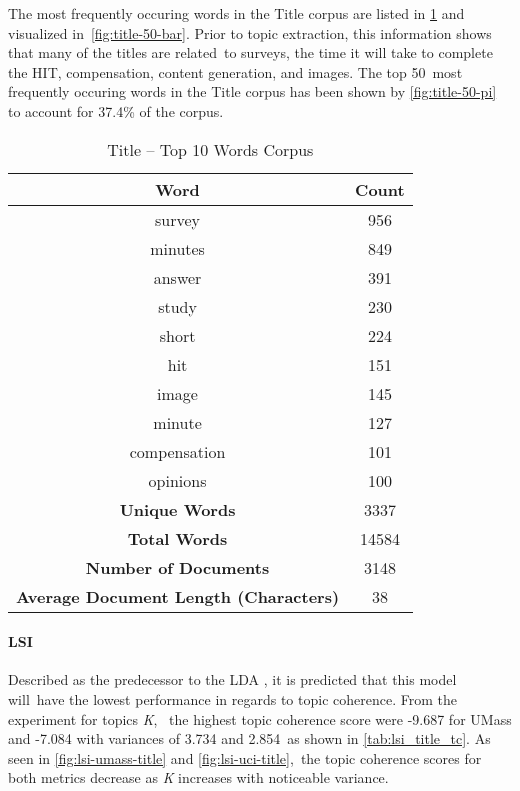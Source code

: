\documentclass[letterpaper,12pt]{article}
\begin{document}
The most frequently occuring words in the Title corpus are listed in \ref{tab:title_top_words} and visualized in\
\ref{fig:title-50-bar}. Prior to topic extraction, this information shows that many of the titles are related\
to surveys, the time it will take to complete the HIT, compensation, content generation, and images. The top 50\
most frequently occuring words in the Title corpus has been shown by \ref{fig:title-50-pi} to account for 37.4\%
of the corpus.

\begin{table}
	\caption{\label{tab:title_top_words} Title -- Top 10 Words Corpus}
	\begin{center}
		\begin{tabular}{|c|c|}
			\hline
			\textbf{Word} & \textbf{Count} \\
			\hline
			survey & 956 \\
			\hline
			minutes & 849 \\
			\hline
			answer & 391 \\
			\hline
			study & 230 \\
			\hline
			short & 224 \\
			\hline
			hit & 151 \\
			\hline
			image & 145 \\
			\hline
			minute & 127 \\
			\hline
			compensation & 101 \\
			\hline
			opinions & 100 \\
			\hline
			\textbf{Unique Words} & 3337 \\
			\hline
			\textbf{Total Words} & 14584 \\
			\hline
			\textbf{Number of Documents} & 3148 \\
			\hline
			\textbf{Average Document Length (Characters)} & 38 \\
			\hline
		\end{tabular}
	\end{center}
\end{table}



\newpage
\paragraph{LSI}

Described as the predecessor to the LDA \cite{blei2003latent}, it is predicted that this model will\
have the lowest performance in regards to topic coherence. From the experiment for topics \emph{K}, \
the highest topic coherence score were -9.687 for UMass and -7.084 with variances of 3.734 and 2.854\
as shown in \ref{tab:lsi_title_tc}. As seen in \ref{fig:lsi-umass-title} and \ref{fig:lsi-uci-title},\
the topic coherence scores for both metrics decrease as \emph{K} increases with noticeable variance.
\end{document}
